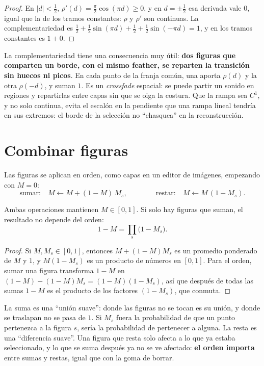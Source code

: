 \begin{proof}
En $|d|<\tfrac12$, $\rho'(d)=\tfrac\pi2\cos(\pi d)\ge0$, y en $d=\pm\tfrac12$ esa derivada vale $0$,
igual que la de los tramos constantes: $\rho$ y $\rho'$ son continuas. La complementariedad es
$\tfrac12+\tfrac12\sin(\pi d)+\tfrac12+\tfrac12\sin(-\pi d)=1$, y en los tramos constantes es
$1+0$.
\end{proof}

La complementariedad tiene una consecuencia muy útil: \textbf{dos figuras que comparten un borde,
con el mismo feather, se reparten la transición sin huecos ni picos}. En cada punto de la franja
común, una aporta $\rho(d)$ y la otra $\rho(-d)$, y suman $1$. Es un \emph{crossfade} espacial: se
puede partir un sonido en regiones y repartirlas entre capas sin que se oiga la costura. Que la
rampa sea $C^1$, y no solo continua, evita el escalón en la pendiente que una rampa lineal tendría
en sus extremos: el borde de la selección no ``chasquea'' en la reconstrucción.

\section{Combinar figuras}

Las figuras se aplican en orden, como capas en un editor de imágenes, empezando con $M=0$:
\[
  \text{sumar:}\quad M\leftarrow M+(1-M)\,M_s,\qquad\qquad
  \text{restar:}\quad M\leftarrow M\,(1-M_s).
\]

\begin{proposicion}\label{prop:union}
Ambas operaciones mantienen $M\in[0,1]$. Si solo hay figuras que suman, el resultado no depende
del orden:
\[
  1-M=\prod_s\bigl(1-M_s\bigr).
\]
\end{proposicion}

\begin{proof}
Si $M,M_s\in[0,1]$, entonces $M+(1-M)M_s$ es un promedio ponderado de $M$ y $1$, y $M(1-M_s)$ es
un producto de números en $[0,1]$. Para el orden, sumar una figura transforma $1-M$ en
$(1-M)-(1-M)M_s=(1-M)(1-M_s)$, así que después de todas las sumas $1-M$ es el producto de los
factores $(1-M_s)$, que conmuta.
\end{proof}

La suma es una ``unión suave'': donde las figuras no se tocan es su unión, y donde se traslapan
no se pasa de $1$. Si $M_s$ fuera la probabilidad de que un punto pertenezca a la figura $s$,
sería la probabilidad de pertenecer a alguna. La resta es una ``diferencia suave''. Una figura
que resta solo afecta a lo que ya estaba seleccionado, y lo que se suma después ya no se ve
afectado: \textbf{el orden importa} entre sumas y restas, igual que con la goma de borrar.

